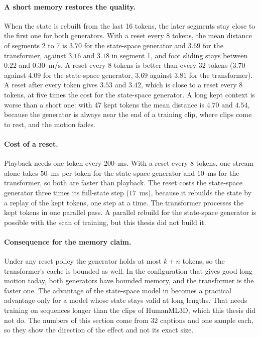 \paragraph{A short memory restores the quality.} When the state is rebuilt from the last 16 tokens, the later segments stay close to the first one for both generators. With a reset every 8 tokens, the mean distance of segments 2 to 7 is $3.70$ for the state-space generator and $3.69$ for the transformer, against $3.16$ and $3.18$ in segment 1, and foot sliding stays between $0.22$ and $0.30$~m/s. A reset every 8 tokens is better than every 32 tokens ($3.70$ against $4.09$ for the state-space generator, $3.69$ against $3.81$ for the transformer). A reset after every token gives $3.53$ and $3.42$, which is close to a reset every 8 tokens, at five times the cost for the state-space generator. A long kept context is worse than a short one: with 47 kept tokens the mean distance is $4.70$ and $4.54$, because the generator is always near the end of a training clip, where clips come to rest, and the motion fades.

\paragraph{Cost of a reset.} Playback needs one token every 200~ms. With a reset every 8 tokens, one stream alone takes $50$~ms per token for the state-space generator and $10$~ms for the transformer, so both are faster than playback. The reset costs the state-space generator three times its full-state step ($17$~ms), because it rebuilds the state by a replay of the kept tokens, one step at a time. The transformer processes the kept tokens in one parallel pass. A parallel rebuild for the state-space generator is possible with the scan of training, but this thesis did not build it.

\paragraph{Consequence for the memory claim.} Under any reset policy the generator holds at most $k + n$ tokens, so the transformer's cache is bounded as well. In the configuration that gives good long motion today, both generators have bounded memory, and the transformer is the faster one. The advantage of the state-space model in  becomes a practical advantage only for a model whose state stays valid at long lengths. That needs training on sequences longer than the clips of HumanML3D, which this thesis did not do. The numbers of this section come from 32 captions and one sample each, so they show the direction of the effect and not its exact size.

